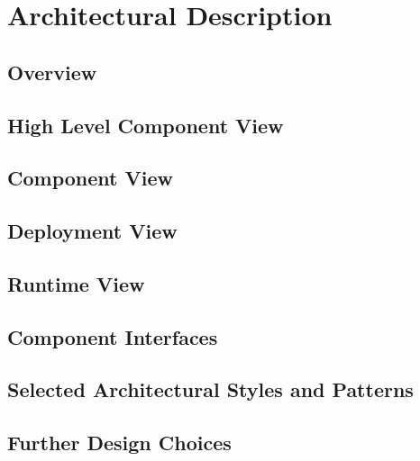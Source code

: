 \section{Architectural Description}

\subsection{Overview}

\subsection{High Level Component View}

\subsection{Component View}

\subsection{Deployment View}

\subsection{Runtime View}

\subsection{Component Interfaces}

\subsection{Selected Architectural Styles and Patterns}

\subsection{Further Design Choices}

